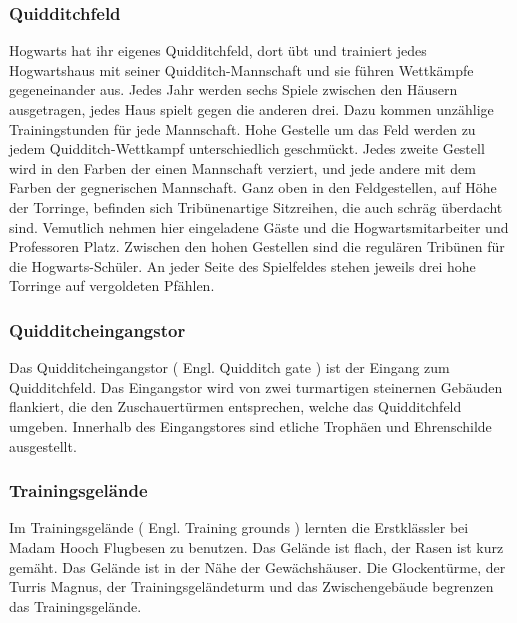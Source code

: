\documentclass[a4paper, 10pt]{article}
\begin{document}
\subsubsection*{\large Quidditchfeld}
Hogwarts hat ihr eigenes Quidditchfeld, dort übt und trainiert jedes Hogwartshaus mit seiner Quidditch-Mannschaft und sie führen Wettkämpfe gegeneinander aus. Jedes Jahr werden sechs Spiele zwischen den Häusern ausgetragen, jedes Haus spielt gegen die anderen drei. Dazu kommen unzählige Trainingstunden für jede Mannschaft.
\vspace{10pt}
\newline
{}  
Hohe Gestelle um das Feld werden zu jedem Quidditch-Wettkampf unterschiedlich geschmückt. Jedes zweite Gestell wird in den Farben der einen Mannschaft verziert, und jede andere mit dem Farben der gegnerischen Mannschaft. Ganz oben in den Feldgestellen, auf Höhe der Torringe, befinden sich Tribünenartige Sitzreihen, die auch schräg überdacht sind. Vemutlich nehmen hier eingeladene Gäste und die Hogwartsmitarbeiter und Professoren Platz. Zwischen den hohen Gestellen sind die regulären Tribünen für die Hogwarts-Schüler.
\vspace{10pt}
\newline
{}  
An jeder Seite des Spielfeldes stehen jeweils drei hohe Torringe auf vergoldeten Pfählen.
\subsubsection*{\large Quidditcheingangstor}
Das Quidditcheingangstor (  Engl.  Quidditch gate ) ist der Eingang zum Quidditchfeld. Das Eingangstor wird von zwei turmartigen steinernen Gebäuden flankiert, die den Zuschauertürmen entsprechen, welche das Quidditchfeld umgeben. Innerhalb des Eingangstores sind etliche Trophäen und Ehrenschilde ausgestellt.
\subsubsection*{\large Trainingsgelände}
Im Trainingsgelände (  Engl.  Training grounds ) lernten die Erstklässler bei Madam Hooch Flugbesen zu benutzen. Das Gelände ist flach, der Rasen ist kurz gemäht. Das Gelände ist in der Nähe der Gewächshäuser. Die Glockentürme, der Turris Magnus, der Trainingsgeländeturm und das Zwischengebäude begrenzen das Trainingsgelände.
\end{document}
